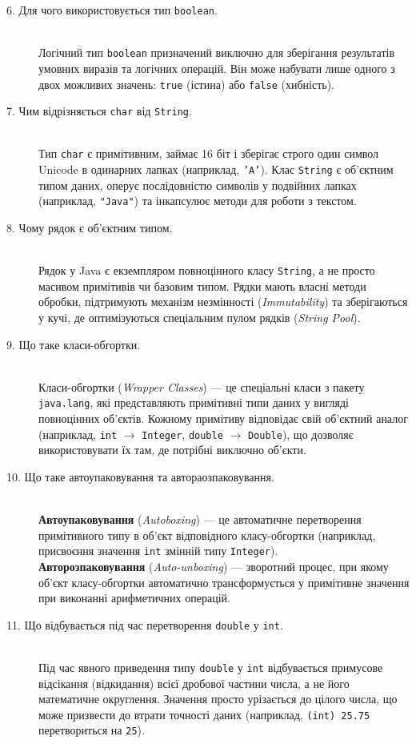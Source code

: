 \begin{description}
    \item[6. Для чого використовується тип \texttt{boolean}.] ~\\
    Логічний тип \texttt{boolean} призначений виключно для зберігання результатів умовних виразів та логічних операцій. Він може набувати лише одного з двох можливих значень: \texttt{true} (істина) або \texttt{false} (хибність).

    \item[7. Чим відрізняється \texttt{char} від \texttt{String}.] ~\\
    Тип \texttt{char} є примітивним, займає 16 біт і зберігає строго один символ Unicode в одинарних лапках (наприклад, \texttt{'A'}). Клас \texttt{String} є об'єктним типом даних, оперує послідовністю символів у подвійних лапках (наприклад, \texttt{"Java"}) та інкапсулює методи для роботи з текстом.

    \item[8. Чому рядок є об'єктним типом.] ~\\
    Рядок у Java є екземпляром повноцінного класу \texttt{String}, а не просто масивом примітивів чи базовим типом. Рядки мають власні методи обробки, підтримують механізм незмінності (\textit{Immutability}) та зберігаються у кучі, де оптимізуються спеціальним пулом рядків (\textit{String Pool}).

    \item[9. Що таке класи-обгортки.] ~\\
    Класи-обгортки (\textit{Wrapper Classes}) — це спеціальні класи з пакету \texttt{java.lang}, які представляють примітивні типи даних у вигляді повноцінних об'єктів. Кожному примітиву відповідає свій об'єктний аналог (наприклад, \texttt{int} $\rightarrow$ \texttt{Integer}, \texttt{double} $\rightarrow$ \texttt{Double}), що дозволяє використовувати їх там, де потрібні виключно об'єкти.

    \item[10. Що таке автоупаковування та автораозпаковування.] ~\\
    \textbf{Автоупаковування} (\textit{Autoboxing}) — це автоматичне перетворення примітивного типу в об'єкт відповідного класу-обгортки (наприклад, присвоєння значення \texttt{int} змінній типу \texttt{Integer}). \\
    \textbf{Авторозпаковування} (\textit{Auto-unboxing}) — зворотний процес, при якому об'єкт класу-обгортки автоматично трансформується у примітивне значення при виконанні арифметичних операцій.
    \item[11. Що відбувається під час перетворення \texttt{double} у \texttt{int}.] ~\\
    Під час явного приведення типу \texttt{double} у \texttt{int} відбувається примусове відсікання (відкидання) всієї дробової частини числа, а не його математичне округлення. Значення просто урізається до цілого числа, що може призвести до втрати точності даних (наприклад, \texttt{(int) 25.75} перетвориться на \texttt{25}).


\end{description}
